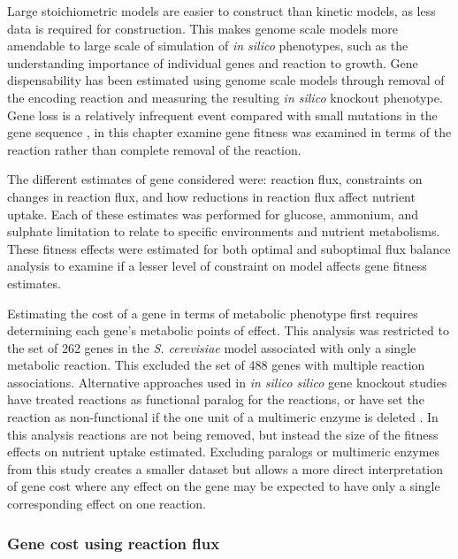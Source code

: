 Large stoichiometric models are easier to construct than kinetic models, as less data is required for construction. This makes genome scale models more amendable to large scale of simulation of \emph{in silico} phenotypes, such as the understanding importance of individual genes and reaction to growth. Gene dispensability has been estimated using genome scale models through removal of the encoding reaction and measuring the resulting \emph{in silico} knockout phenotype. Gene loss is a relatively infrequent event compared with small mutations in the gene sequence \cite{pal2006}, in this chapter examine gene fitness was examined in terms of the reaction rather than complete removal of the reaction.

The different estimates of gene considered were: reaction flux, constraints on changes in reaction flux, and how reductions in reaction flux affect nutrient uptake. Each of these estimates was performed for glucose, ammonium, and sulphate limitation to relate to specific environments and nutrient metabolisms. These fitness effects were estimated for both optimal and suboptimal flux balance analysis to examine if a lesser level of constraint on model affects gene fitness estimates.

Estimating the cost of a gene in terms of metabolic phenotype first requires determining each gene's metabolic points of effect. This analysis was restricted to the set of 262 genes in the \emph{S. cerevisiae} model associated with only a single metabolic reaction. This excluded the set of 488 genes with multiple reaction associations. Alternative approaches used in \emph{in silico silico} gene knockout studies have treated reactions as functional paralog for the reactions, or have set the reaction as non-functional if the one unit of a multimeric enzyme is deleted \cite{pal2006}. In this analysis reactions are not being removed, but instead the size of the fitness effects on nutrient uptake estimated. Excluding paralogs or multimeric enzymes from this study creates a smaller dataset but allows a more direct interpretation of gene cost where any effect on the gene may be expected to have only a single corresponding effect on one reaction.

\subsubsection{Gene cost using reaction flux}%

